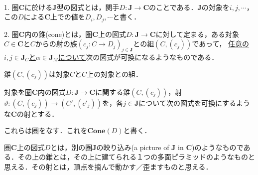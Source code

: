 \documentclass[uplatex, dvipdfmx]{jsarticle}
\begin{document}
\begin{definition}[図式，錐]　

    1. 圏$\mathbf{C}$に於ける$\mathbf{J}$型の図式とは，関手$D:\mathbf{J}\to \mathbf{C}$のことである．$\mathbf{J}$の対象を$i,j,\cdots$，この$D$による$\mathbf{C}$上での値を$D_i,D_j,\cdots$と書く．

    2. 圏$\mathbf{C}$内の錐(cone)とは，圏$\mathbf{C}$上の図式$D:\mathbf{J}\to\mathbf{C}$に対して定まる，ある対象$C\in\mathbf{C}$と$C$からの射の族$(c_j:C\to D_j)_{j\in\mathbf{J}}$との組$(C,(c_j))$であって，
    \underline{任意の$i,j\in\mathbf{J}_C$と$\alpha\in\mathbf{J}_M$について}次の図式が可換になるようなものである．
    \begin{center}
    \end{center}
\end{definition}
\begin{remark*}
    錐$(C,(c_j))$は対象$C$と$C$上の対象との組．
\end{remark*}
\begin{proposition*}[錐全体の圏]
    対象を圏$\mathbf{C}$内の図式$D:\mathbf{J}\to\mathbf{C}$に関する錐$(C,(c_j))$，射$\vartheta:(C,(c_j))\to (C',(c'_j))$を，各$j\in\mathbf{J}$について次の図式を可換にするような$\mathbf{C}$の射とする．
    \begin{center}
    \end{center}
    これらは圏をなす．これを$\mathbf{Cone}(D)$と書く．
\end{proposition*}
\begin{remark*}[錐のイメージ]
    圏$\mathbf{C}$上の図式$D$とは，別の圏$\mathbf{J}$の映り込み(a picture of $\mathbf{J}$ in $\mathbf{C}$)のようなものである．その上の錐とは，その上に建てられる１つの多面ピラミッドのようなものと思える．その射とは，頂点を摘んで動かす／歪ますものと思える．
\end{remark*}
\end{document}
